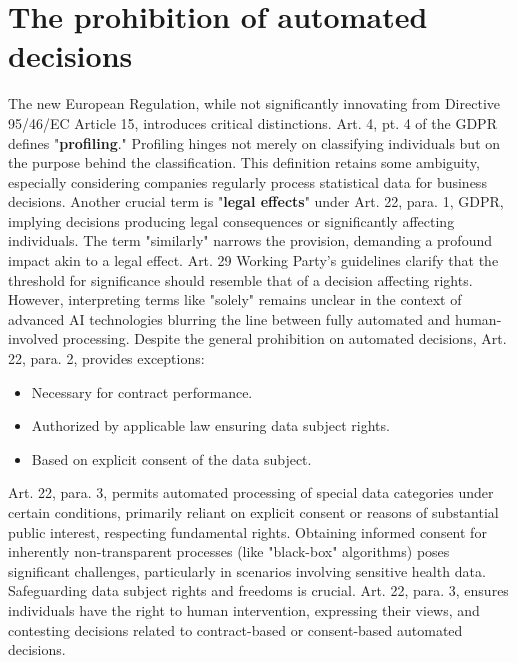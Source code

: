 \section{The prohibition of automated decisions}
The new European Regulation, while not significantly innovating from Directive 95/46/EC Article 15, introduces critical distinctions. Art. 4, pt. 4 of the GDPR defines "\textbf{profiling}." Profiling hinges not merely on classifying individuals but on the purpose behind the classification. This definition retains some ambiguity, especially considering companies regularly process statistical data for business decisions.
\newline
Another crucial term is "\textbf{legal effects}" under Art. 22, para. 1, GDPR, implying decisions producing legal consequences or significantly affecting individuals. The term "similarly" narrows the provision, demanding a profound impact akin to a legal effect. Art. 29 Working Party’s guidelines clarify that the threshold for significance should resemble that of a decision affecting rights.
\newline
However, interpreting terms like "solely" remains unclear in the context of advanced AI technologies blurring the line between fully automated and human-involved processing.
\newline
Despite the general prohibition on automated decisions, Art. 22, para. 2, provides exceptions:

\begin{itemize}
    \item Necessary for contract performance.
    \item Authorized by applicable law ensuring data subject rights.
    \item Based on explicit consent of the data subject.
\end{itemize}

Art. 22, para. 3, permits automated processing of special data categories under certain conditions, primarily reliant on explicit consent or reasons of substantial public interest, respecting fundamental rights.
\newline
Obtaining informed consent for inherently non-transparent processes (like "black-box" algorithms) poses significant challenges, particularly in scenarios involving sensitive health data.
\newline
Safeguarding data subject rights and freedoms is crucial. Art. 22, para. 3, ensures individuals have the right to human intervention, expressing their views, and contesting decisions related to contract-based or consent-based automated decisions.

